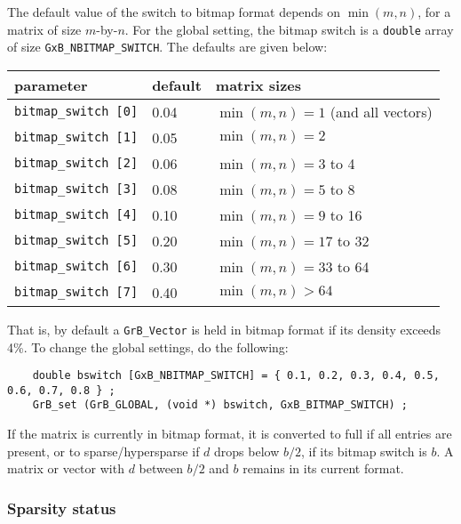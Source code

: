 The default value of the switch to bitmap format depends on $\min(m,n)$, for a
matrix of size $m$-by-$n$.  For the global setting, the bitmap switch is a
\verb'double' array of size \verb'GxB_NBITMAP_SWITCH'.  The defaults are given
below:

\vspace{0.2in}
{\small
\begin{tabular}{lll}
parameter & default & matrix sizes \\
\hline
\verb'bitmap_switch [0]' & 0.04 & $\min(m,n) = 1$ (and all vectors) \\
\verb'bitmap_switch [1]' & 0.05 & $\min(m,n) = 2$ \\
\verb'bitmap_switch [2]' & 0.06 & $\min(m,n) = 3$ to 4 \\
\verb'bitmap_switch [3]' & 0.08 & $\min(m,n) = 5$ to 8 \\
\verb'bitmap_switch [4]' & 0.10 & $\min(m,n) = 9$ to 16\\
\verb'bitmap_switch [5]' & 0.20 & $\min(m,n) = 17$ to 32\\
\verb'bitmap_switch [6]' & 0.30 & $\min(m,n) = 33$ to 64 \\
\verb'bitmap_switch [7]' & 0.40 & $\min(m,n) > 64$ \\
\end{tabular}
}
\vspace{0.2in}

That is, by default a \verb'GrB_Vector' is held in bitmap format if its density
exceeds 4\%.  To change the global settings, do the following:

{\footnotesize
\begin{verbatim}
    double bswitch [GxB_NBITMAP_SWITCH] = { 0.1, 0.2, 0.3, 0.4, 0.5, 0.6, 0.7, 0.8 } ;
    GrB_set (GrB_GLOBAL, (void *) bswitch, GxB_BITMAP_SWITCH) ;
\end{verbatim}
}

If the matrix is currently in bitmap format, it is converted to full if all
entries are present, or to sparse/hypersparse if $d$ drops below $b/2$, if its
bitmap switch is $b$.  A matrix or vector with $d$ between $b/2$ and $b$
remains in its current format.

\subsubsection{Sparsity status}

